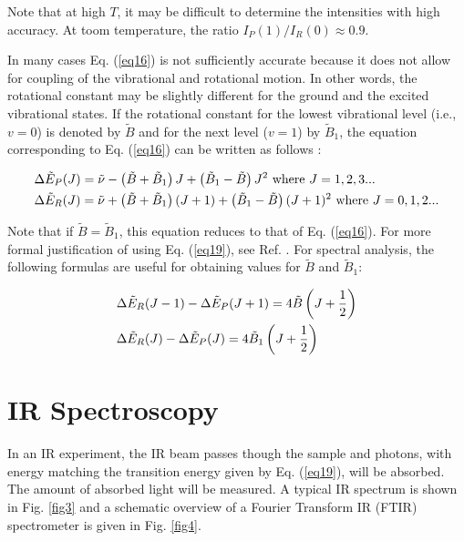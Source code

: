 \documentclass[byrevtex,amssymb,aps,pra,floatfix,letterpaper]{revtex4}
\begin{document}
\noindent
Note that at high $T$, it may be difficult to determine the intensities with high accuracy. At toom temperature, the
ratio $I_P(1) / I_R(0) \approx 0.9$.

In many cases Eq. (\ref{eq16}) is not sufficiently accurate because it does not allow for coupling of the vibrational and rotational motion. In other words, the rotational constant may be slightly different for the ground and the excited vibrational states. If the rotational constant for the lowest vibrational level (i.e., $v = 0$) is denoted by $\tilde{B}$ and for the next level ($v = 1$) by $\tilde{B}_1$, the equation corresponding to Eq. (\ref{eq16}) can be written as follows \cite{ATKINS1}:

\begin{align}
\label{eq19}
& \Delta \tilde{E}_P(J) = \tilde{\nu} - \left(\tilde{B} + \tilde{B}_1\right)J + \left(\tilde{B}_1 - \tilde{B}\right)J^2\textnormal{ where }J=1,2,3...\\
\notag
& \Delta \tilde{E}_R(J) = \tilde{\nu} + \left(\tilde{B} + \tilde{B}_1\right)(J+1) + \left(\tilde{B}_1 - \tilde{B}\right)(J+1)^2\textnormal{ where }J=0,1,2...
\end{align}

\noindent
Note that if $\tilde{B} = \tilde{B}_1$, this equation reduces to that of Eq. (\ref{eq16}). For more formal justification of using Eq. (\ref{eq19}), see Ref. \cite{HERZBERG1}. For spectral analysis, the following formulas are useful for obtaining values for $\tilde{B}$ and $\tilde{B}_1$:

\begin{align}
\label{eq20}
& \Delta\tilde{E}_R(J - 1) - \Delta\tilde{E}_P(J+1) = 4\tilde{B}\left(J + \frac{1}{2}\right)\\
\notag
& \Delta\tilde{E}_R(J) - \Delta\tilde{E}_P(J) = 4\tilde{B}_1\left(J + \frac{1}{2}\right)
\end{align}

\section{IR Spectroscopy}

In an IR experiment, the IR beam passes though the sample and photons, with energy matching the transition energy given by Eq. (\ref{eq19}), will be absorbed. The amount of absorbed light will be measured. A typical IR spectrum is shown in Fig. \ref{fig3} and a schematic overview of a Fourier Transform IR (FTIR) spectrometer is given in Fig. \ref{fig4}.
\end{document}
